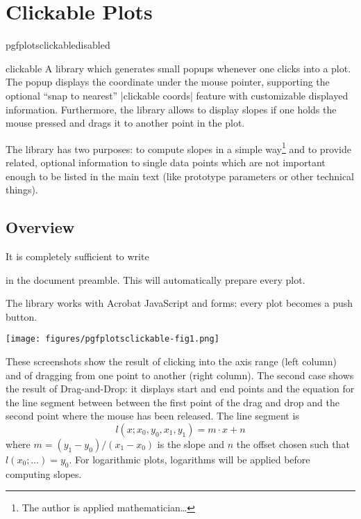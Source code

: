
\section{Clickable Plots}

\begingroup
\def\pgfplotsmanualcurlibrary{clickable}
    \expandafter\ifx\csname pgfplotsclickabledisabled\endcsname\relax
    \else
    \fi

\begin{pgfplotslibrary}{clickable}
    A library which generates small popups whenever one clicks into a plot. The
    popup displays the coordinate under the mouse pointer, supporting the
    optional ``snap to nearest'' |clickable coords| feature with customizable
    displayed information. Furthermore, the library allows to display slopes if
    one holds the mouse pressed and drags it to another point in the plot.

    The library has two purposes: to compute slopes in a simple
    way\footnote{The author is applied mathematician\ldots} and to provide
    related, optional information to single data points which are not important
    enough to be listed in the main text (like prototype parameters or other
    technical things).
\end{pgfplotslibrary}


\subsection{Overview}

It is completely sufficient to write
%
\begin{codeexample}
\end{codeexample}
%
\noindent in the document preamble. This will automatically prepare every plot.

The library works with Acrobat JavaScript and \pdf{} forms: every plot becomes
a push button.

    \texttt{[image: figures/pgfplotsclickable-fig1.png]}
    \hfill

\nobreak These screenshots show the result of clicking into the axis range
(left column) and of dragging from one point to another (right column). The
second case shows the result of Drag-and-Drop: it displays start and end points
and the equation for the line segment between between the first point of the
drag and drop and the second point where the mouse has been released. The line
segment is
%
    \[ l(x; x_0,y_0,x_1,y_1) = m \cdot x + n \]
%
where $m = (y_1-y_0) / (x_1-x_0)$ is the slope and $n$ the offset chosen such
that $l(x_0;\dotsc) = y_0$. For logarithmic plots, logarithms will be applied
before computing slopes.

